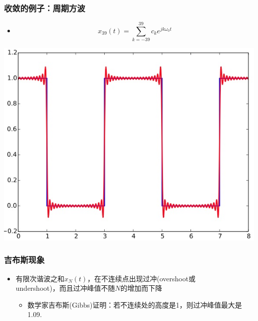 \documentclass[CJKutf8,xcolor=pdftex,dvipsnames,table]{beamer}
\begin{document}
\begin{CJK*}{UTF8}{song}
  \begin{frame}
    \frametitle{收敛的例子：周期方波}
    \begin{itemize}
    \item \[ x_{39}(t)=\sum_{k=-39}^{39}c_k e^{jk\omega_0 t} \]
    \end{itemize}
    \begin{center}
      \includegraphics[scale=.4]{ss-c-f3-9e}
    \end{center}
  \end{frame}   
        
  \begin{frame}
    \frametitle{吉布斯现象}
    \begin{itemize}
    	\item 有限次谐波之和$x_N(t)$，在不连续点出现过冲(overshoot或\\undershoot)，而且过冲峰值不随$N$的增加而下降
		\begin{itemize}
	    	\item 数学家吉布斯(Gibbs)证明：若不连续处的高度是1，则过冲峰值最大是1.09.
		\end{itemize}
    \end{itemize}
  \end{frame}   
          

\end{CJK*}
\end{document}
